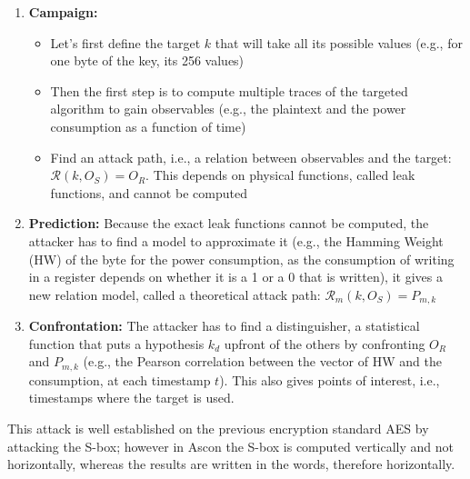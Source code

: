 \documentclass[11pt,technote]{IEEEtran}
\begin{document}
		\begin{enumerate}
			\item \textbf{Campaign:}
			\begin{itemize}
				\item Let's first define the target $k$ that will take all its possible values (e.g., for one byte of the key, its 256 values)
				\item Then the first step is to compute multiple traces of the targeted algorithm to gain observables (e.g., the plaintext and the power consumption as a function of time)
				\item Find an attack path, i.e., a relation between observables and the target: $\mathcal{R}(k,O_S) = O_R$. This depends on physical functions, called leak functions, and cannot be computed
			\end{itemize}
			\item \textbf{Prediction:} Because the exact leak functions cannot be computed, the attacker has to find a model to approximate it (e.g., the Hamming Weight (HW) of the byte for the power consumption, as the consumption of writing in a register depends on whether it is a 1 or a 0 that is written), it gives a new relation model, called a theoretical attack path: $\mathcal{R}_m(k,O_S) = P_{m,k}$
			\item \textbf{Confrontation:} The attacker has to find a distinguisher, a statistical function that puts a hypothesis $k_d$ upfront of the others by confronting $O_R$ and $P_{m,k}$ (e.g., the Pearson correlation between the vector of HW and the consumption, at each timestamp $t$). This also gives points of interest, i.e., timestamps where the target is used.
		\end{enumerate}

		This attack is well established on the previous encryption standard AES \cite{aes,cpa_aes} by attacking the S-box; however in Ascon the S-box is computed vertically and not horizontally, whereas the results are written in the words, therefore horizontally.
		
\end{document}
